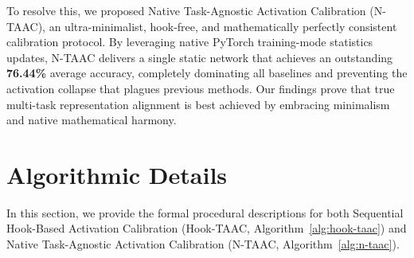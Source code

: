 \documentclass{article}
\theoremstyle{plain}
\theoremstyle{definition}
\theoremstyle{remark}
\begin{document}
To resolve this, we proposed Native Task-Agnostic Activation Calibration (N-TAAC), an ultra-minimalist, hook-free, and mathematically perfectly consistent calibration protocol. By leveraging native PyTorch training-mode statistics updates, N-TAAC delivers a single static network that achieves an outstanding \textbf{76.44\%} average accuracy, completely dominating all baselines and preventing the activation collapse that plagues previous methods. Our findings prove that true multi-task representation alignment is best achieved by embracing minimalism and native mathematical harmony.




\newpage
\appendix
\onecolumn

\section{Algorithmic Details}
\label{appendix-algorithms}

In this section, we provide the formal procedural descriptions for both Sequential Hook-Based Activation Calibration (Hook-TAAC, Algorithm~\ref{alg:hook-taac}) and Native Task-Agnostic Activation Calibration (N-TAAC, Algorithm~\ref{alg:n-taac}). 
\end{document}
